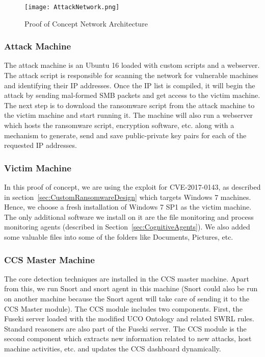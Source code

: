 \begin{figure}	
	\texttt{[image: AttackNetwork.png]}
	\caption{Proof of Concept Network Architecture}	
	\label{fig:AttackNetwork}
\end{figure}

\subsubsection{Attack Machine}
The attack machine is an Ubuntu 16 loaded with custom scripts and a webserver. The attack script is responsible for scanning the network for vulnerable machines and identifying their IP addresses. Once the IP list is compiled, it will begin the attack by sending mal-formed SMB packets and get access to the victim machine. The next step is to download the ransomware script from the attack machine to the victim machine and start running it. The machine will also run a webserver which hosts the ransomware script, encryption software, etc. along with a mechanism to generate, send and save public-private key pairs for each of the requested IP addresses. 

\subsubsection{Victim Machine}
In this proof of concept, we are using the exploit for CVE-2017-0143, as described in section~\ref{sec:CustomRansomwareDesign} which targets Windows 7 machines. Hence, we choose a fresh installation of Windows 7 SP1 as the victim machine. The only additional software we install on it are the file monitoring and process monitoring agents (described in Section~\ref{sec:CognitiveAgents}). We also added some valuable files into some of the folders like Documents, Pictures, etc. 

\subsubsection{CCS Master Machine}
The core detection techniques are installed in the CCS master machine. Apart from this, we run Snort and snort agent in this machine (Snort could also be run on another machine because the Snort agent will take care of sending it to the CCS Master module). The CCS module includes two components. First, the Fuseki server loaded with the modified UCO Ontology and related SWRL rules. Standard reasoners are also part of the Fuseki server. The CCS module is the second component which extracts new information related to new attacks, host machine activities, etc. and updates the CCS dashboard dynamically.

